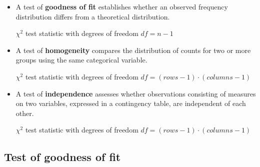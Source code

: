 \documentclass{article}
\begin{document}
\begin{itemize}
    \item A test of \textbf{goodness of fit} establishes whether an observed frequency 
    distribution differs from a theoretical distribution.

    $\chi^2$ test statistic with degrees of freedom $df=n-1$
    \item A test of \textbf{homogeneity} compares the distribution of counts for 
    two or more groups using the same categorical variable.

    $\chi^2$ test statistic with degrees of freedom $df=(rows-1)\cdot(columns-1)$
    \item A test of \textbf{independence} assesses whether observations consisting of 
    measures on two variables, expressed in a contingency table, are independent of each other.
    
    $\chi^2$ test statistic with degrees of freedom $df=(rows-1)\cdot(columns-1)$
\end{itemize}

\subsection{Test of goodness of fit}
\end{document}
